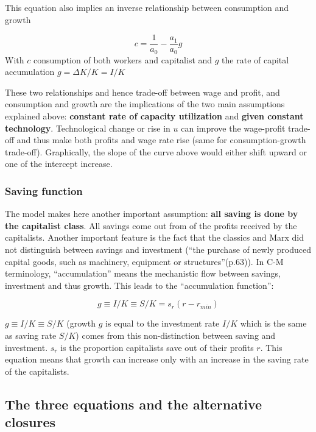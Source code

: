 \documentclass[
  letterpaper,
  DIV=11,
  numbers=noendperiod]{scrreprt}
\begin{document}
This equation also implies an inverse relationship between consumption
and growth

\[
c = \frac{1}{a_0}-\frac{a_1}{a_0}g
\] With \(c\) consumption of both workers and capitalist and \(g\) the
rate of capital accumulation \(g = \Delta{K}/K = I/K\)

These two relationships and hence trade-off between wage and profit, and
consumption and growth are the implications of the two main assumptions
explained above: \textbf{constant rate of capacity utilization} and
\textbf{given constant technology}. Technological change or rise in
\(u\) can improve the wage-profit trade-off and thus make both profits
and wage rate rise (same for consumption-growth trade-off). Graphically,
the slope of the curve above would either shift upward or one of the
intercept increase.

\hypertarget{saving-function}{%
\subsubsection{Saving function}\label{saving-function}}

The model makes here another important assumption: \textbf{all saving is
done by the capitalist class}. All savings come out from of the profits
received by the capitalists. Another important feature is the fact that
the classics and Marx did not distinguish between savings and investment
(``the purchase of newly produced capital goods, such as machinery,
equipment or structures''(p.63)). In C-M terminology, ``accumulation''
means the mechanistic flow between savings, investment and thus growth.
This leads to the ``accumulation function'':

\[
g \equiv I/K \equiv S/K = s_r(r-r_{min})
\]

\(g \equiv I/K \equiv S/K\) (growth \(g\) is equal to the investment
rate \(I/K\) which is the same as saving rate \(S/K\)) comes from this
non-distinction between saving and investment. \(s_r\) is the proportion
capitalists save out of their profits \(r\). This equation means that
growth can increase only with an increase in the saving rate of the
capitalists.

\hypertarget{the-three-equations-and-the-alternative-closures}{%
\subsection{The three equations and the alternative
closures}\label{the-three-equations-and-the-alternative-closures}}
\end{document}
